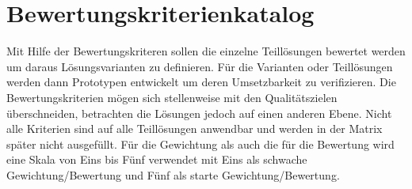 \section{Bewertungskriterienkatalog}

Mit Hilfe der Bewertungskriteren sollen die einzelne Teillösungen bewertet werden um daraus Lösungsvarianten zu definieren. Für die Varianten oder Teillösungen werden dann Prototypen entwickelt um deren Umsetzbarkeit zu verifizieren. Die Bewertungskriterien mögen sich stellenweise mit den Qualitätszielen überschneiden, betrachten die Lösungen jedoch auf einen anderen Ebene. Nicht alle Kriterien sind auf alle Teillösungen anwendbar und werden in der Matrix später nicht ausgefüllt.\newline
Für die Gewichtung als auch die für die Bewertung wird eine Skala von Eins bis Fünf verwendet mit Eins als schwache Gewichtung/Bewertung und Fünf als starte Gewichtung/Bewertung.

